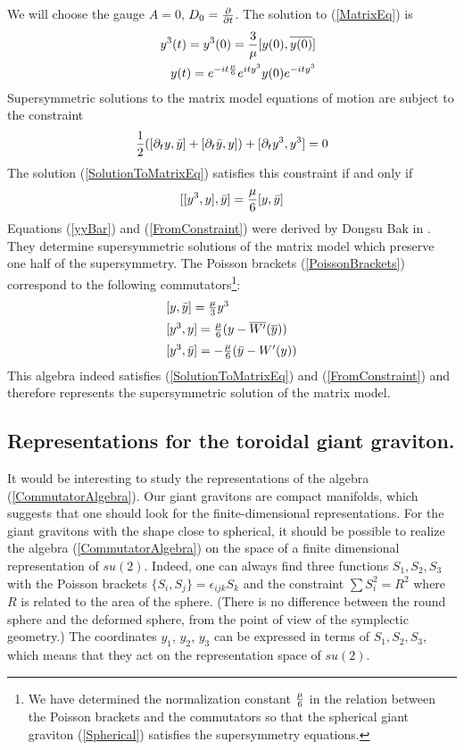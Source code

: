 \documentclass[a4paper,12pt]{article}
\begin{document}
We will choose the gauge $A=0$, $D_0={\partial\over\partial t}$.
The solution to (\ref{MatrixEq}) is
\begin{eqnarray}\label{SolutionToMatrixEq}
&& y^3(t)=y^3(0)={3\over\mu}[y(0),\overline{y(0)}]\label{yyBar}\\
&& y(t)=e^{-it {\mu\over 6}} e^{ity^3} y(0) e^{-ity^3}
\end{eqnarray}
Supersymmetric solutions to the matrix model equations of motion
are subject to the constraint
\begin{equation}
{1\over 2}([\partial_t y, \bar{y}]+[\partial_t \bar{y},y])
+[\partial_t y^3, y^3]=0
\end{equation}
The solution (\ref{SolutionToMatrixEq}) satisfies this constraint
if and only if
\begin{equation}\label{FromConstraint}
[[y^3,y],\bar{y}]={\mu\over 6}[y,\bar{y}]
\end{equation}
Equations (\ref{yyBar}) and (\ref{FromConstraint}) were derived by Dongsu
Bak in \cite{Bak}. They determine supersymmetric solutions of the matrix
model which preserve one half of the supersymmetry.
The Poisson brackets (\ref{PoissonBrackets}) correspond to the following
commutators\footnote{We have determined the normalization constant $\mu\over 6$
in the relation between the Poisson brackets and the commutators so that the
spherical giant graviton (\ref{Spherical}) satisfies the supersymmetry equations.}:
\begin{equation}\label{CommutatorAlgebra}
\begin{array}{l}
[y,\bar{y}]={\mu\over 3} y^3\\[5pt]
[y^3,y]={\mu\over 6}(y-\overline{W'}(\overline{y}))\\[5pt]
[y^3,\bar{y}]=-{\mu\over 6}(\bar{y}-W'(y))
\end{array}
\end{equation}
This algebra indeed satisfies (\ref{SolutionToMatrixEq}) and
(\ref{FromConstraint}) and therefore represents the supersymmetric solution
of the matrix model.

\subsection{Representations for the toroidal giant graviton.}
It would be interesting to study the representations of the algebra
(\ref{CommutatorAlgebra}).
Our giant gravitons are compact manifolds, which suggests that one should
look for the finite-dimensional representations. For the giant gravitons
with the shape close to spherical, it should be possible to realize the algebra
(\ref{CommutatorAlgebra}) on the space of a finite dimensional representation
of $su(2)$. Indeed, one can always find three
functions $S_1,S_2,S_3$ with the Poisson brackets
$\{S_i,S_j\}=\epsilon_{ijk}S_k$ and the constraint $\sum S_i^2=R^2$ where
$R$ is related to the area of the sphere. (There is no difference between
the round sphere and the deformed sphere, from the point of view of the
symplectic geometry.) The coordinates $y_1$, $y_2$, $y_3$ can be expressed
in terms of $S_1,S_2,S_3$, which means that they act on the
representation space of $su(2)$.
\end{document}
